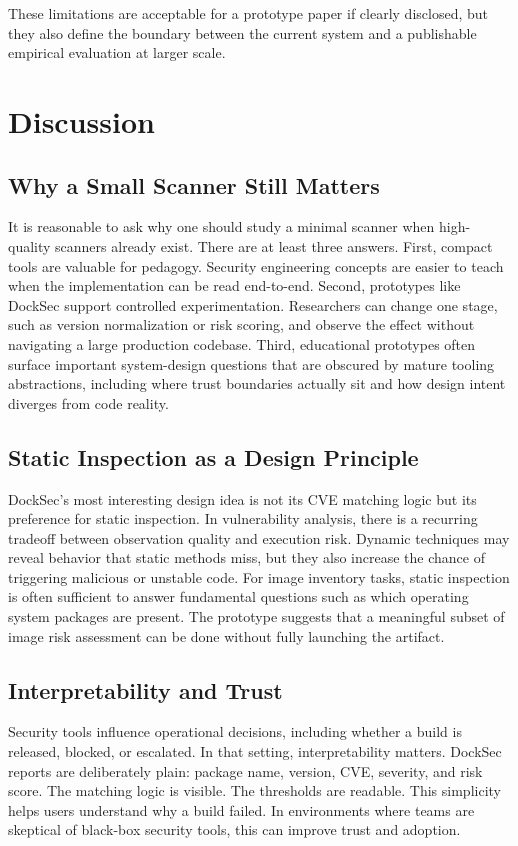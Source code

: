 \documentclass[12pt,draftclsnofoot,onecolumn]{IEEEtran}
\begin{document}
These limitations are acceptable for a prototype paper if clearly disclosed, but they also define the boundary between the current system and a publishable empirical evaluation at larger scale.

\section{Discussion}
\subsection{Why a Small Scanner Still Matters}
It is reasonable to ask why one should study a minimal scanner when high-quality scanners already exist. There are at least three answers. First, compact tools are valuable for pedagogy. Security engineering concepts are easier to teach when the implementation can be read end-to-end. Second, prototypes like DockSec support controlled experimentation. Researchers can change one stage, such as version normalization or risk scoring, and observe the effect without navigating a large production codebase. Third, educational prototypes often surface important system-design questions that are obscured by mature tooling abstractions, including where trust boundaries actually sit and how design intent diverges from code reality.

\subsection{Static Inspection as a Design Principle}
DockSec's most interesting design idea is not its CVE matching logic but its preference for static inspection. In vulnerability analysis, there is a recurring tradeoff between observation quality and execution risk. Dynamic techniques may reveal behavior that static methods miss, but they also increase the chance of triggering malicious or unstable code. For image inventory tasks, static inspection is often sufficient to answer fundamental questions such as which operating system packages are present. The prototype suggests that a meaningful subset of image risk assessment can be done without fully launching the artifact.

\subsection{Interpretability and Trust}
Security tools influence operational decisions, including whether a build is released, blocked, or escalated. In that setting, interpretability matters. DockSec reports are deliberately plain: package name, version, CVE, severity, and risk score. The matching logic is visible. The thresholds are readable. This simplicity helps users understand why a build failed. In environments where teams are skeptical of black-box security tools, this can improve trust and adoption.
\end{document}

